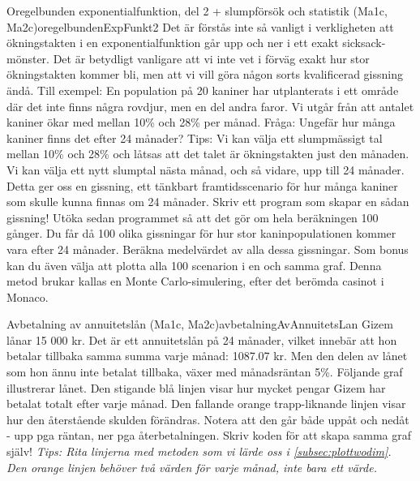 \begin{matteovnings}{Oregelbunden exponentialfunktion, del 2 + slumpförsök och statistik (Ma1c, Ma2c)}{oregelbundenExpFunkt2}
Det är förstås inte så vanligt i verkligheten att ökningstakten i en exponentialfunktion går upp och ner i ett exakt sicksack-mönster. Det är betydligt vanligare att vi inte vet i förväg exakt hur stor ökningstakten kommer bli, men att vi vill göra någon sorts kvalificerad gissning ändå.
\newline
\newline
Till exempel: En population på 20 kaniner har utplanterats i ett område där det inte finns några rovdjur, men en del andra faror. Vi utgår från att antalet kaniner ökar med mellan 10\% och 28\% per månad.
\newline
\newline
Fråga: Ungefär hur många kaniner finns det efter 24 månader?
\newline
\newline
Tips: Vi kan välja ett slumpmässigt tal mellan 10\% och 28\% och låtsas att det talet är ökningstakten just den månaden. Vi kan välja ett nytt slumptal nästa månad, och så vidare, upp till 24 månader. Detta ger oss en gissning, ett tänkbart framtidsscenario för hur många kaniner som skulle kunna finnas om 24 månader. Skriv ett program som skapar en sådan gissning!
\newline
\newline
Utöka sedan programmet så att det gör om hela beräkningen 100 gånger. Du får då 100 olika gissningar för hur stor kaninpopulationen kommer vara efter 24 månader. Beräkna medelvärdet av alla dessa gissningar. Som bonus kan du även välja att plotta alla 100 scenarion i en och samma graf.
\newline
\newline
Denna metod brukar kallas en Monte Carlo-simulering, efter det berömda casinot i Monaco.
\end{matteovnings}
\newpage
\begin{matteovnings}{Avbetalning av annuitetslån (Ma1c, Ma2c)}{avbetalningAvAnnuitetsLan}
Gizem lånar 15 000 kr. Det är ett annuitetslån på 24 månader, vilket innebär att hon betalar tillbaka samma summa varje månad: 1087.07 kr. Men den delen av lånet som hon ännu inte betalat tillbaka, växer med månadsräntan 5\%. Följande graf illustrerar lånet.
Den stigande blå linjen visar hur mycket pengar Gizem har betalat totalt efter varje månad. Den fallande orange trapp-liknande linjen visar hur den återstående skulden förändras. Notera att den går både uppåt och nedåt - upp pga räntan, ner pga återbetalningen. Skriv koden för att skapa samma graf själv!
\newline
\newline
\emph{Tips: Rita linjerna med metoden som vi lärde oss i \autoref{subsec:plottwodim}. Den orange linjen behöver två värden för varje månad, inte bara ett värde.}
\end{matteovnings}
\newpage

